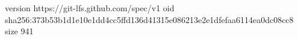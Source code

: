 version https://git-lfs.github.com/spec/v1
oid sha256:373b53b1d1e10e1dd4cc5ffd136d41315e086213e2e1dfefaa6114ea0dc08cc8
size 941
